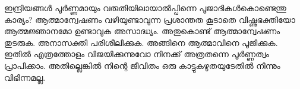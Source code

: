 ഇന്ദ്രിയങ്ങള്‍ പൂര്‍ണ്ണമായും വരുതിയിലായാല്‍പ്പിന്നെ  പൂജാദികള്‍കൊണ്ടെന്തു കാര്യം? ആത്മാന്വേഷണം വഴിയുണ്ടാവുന്ന പ്രശാന്തത കൂടാതെ വിഷ്ണുഭക്തിയോ ആത്മജ്ഞാനമോ ഉണ്ടാവുക അസാദ്ധ്യം. അതുകൊണ്ട് ആത്മാന്വേഷണം തുടരുക. അനാസക്തി പരിശീലിക്കുക. അങ്ങിനെ ആത്മാവിനെ പൂജിക്കുക. ഇതില്‍ എത്രത്തോളം വിജയിക്കുന്നുവോ നിനക്ക് അത്രതന്നെ പൂര്‍ണ്ണത്വം പ്രാപിക്കാം. അതില്ലെങ്കില്‍ നിന്റെ ജീവിതം ഒരു കാട്ടുകഴുതയുടേതില്‍ നിന്നും വിഭിന്നമല്ല.

